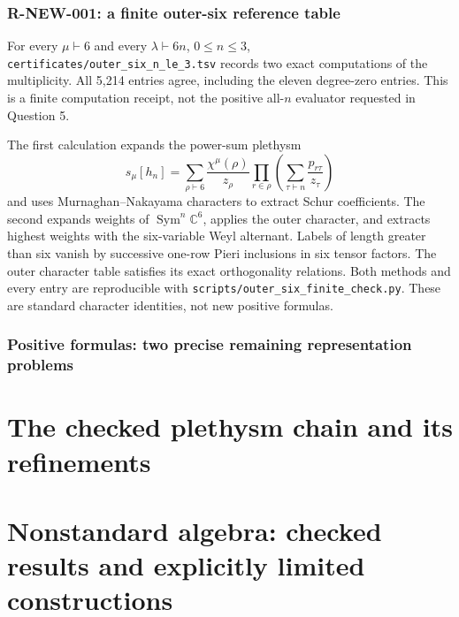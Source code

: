\documentclass[11pt]{article}
\theoremstyle{definition}\newtheorem{definition}[theorem]{Definition}
\theoremstyle{remark}\newtheorem{remark}[theorem]{Remark}
\begin{document}
\section{R-NEW-001: a finite outer-six reference table}
For every $\mu\vdash6$ and every $\lambda\vdash6n$, $0\le n\le3$,
\texttt{certificates/outer\_six\_n\_le\_3.tsv} records two exact
computations of the multiplicity. All 5,214 entries agree, including
the eleven degree-zero entries. This is a finite computation receipt,
not the positive all-$n$ evaluator requested in Question 5.

The first calculation expands the power-sum plethysm
\[
 s_\mu[h_n]=\sum_{\rho\vdash6}\frac{\chi^\mu(\rho)}{z_\rho}
 \prod_{r\in\rho}\left(\sum_{\tau\vdash n}\frac{p_{r\tau}}{z_\tau}\right)
\]
and uses Murnaghan--Nakayama characters to extract Schur coefficients.
The second expands weights of $\operatorname{Sym}^n\mathbb C^6$,
applies the outer character, and extracts highest weights with the
six-variable Weyl alternant. Labels of length greater than six vanish
by successive one-row Pieri inclusions in six tensor factors. The outer
character table satisfies its exact orthogonality relations. Both
methods and every entry are reproducible with
\texttt{scripts/outer\_six\_finite\_check.py}. These are standard
character identities, not new positive formulas.



\section{Positive formulas: two precise remaining representation problems}




\part{The checked plethysm chain and its refinements}


\part{Nonstandard algebra: checked results and explicitly limited constructions}




\end{document}
